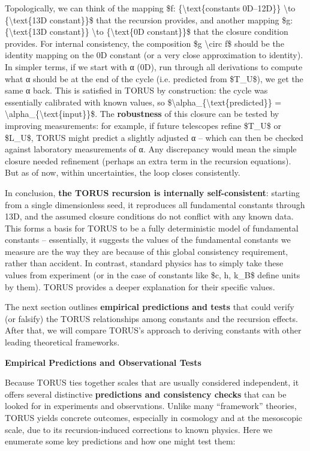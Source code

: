 \documentclass[]{article}
\begin{document}
Topologically, we can think of the mapping \$f:
\{\textbackslash{}text\{constants 0D--12D\}\} \textbackslash{}to
\{\textbackslash{}text\{13D constant\}\}\$ that the recursion provides,
and another mapping \$g: \{\textbackslash{}text\{13D constant\}\}
\textbackslash{}to \{\textbackslash{}text\{0D constant\}\}\$ that the
closure condition provides. For internal consistency, the composition
\$g \textbackslash{}circ f\$ should be the identity mapping on the 0D
constant (or a very close approximation to identity). In simpler terms,
if we start with α (0D), run through all derivations to compute what α
should be at the end of the cycle (i.e. predicted from \$T\_U\$), we get
the same α back. This is satisfied in TORUS by construction: the cycle
was essentially calibrated with known values, so
\$\textbackslash{}alpha\_\{\textbackslash{}text\{predicted\}\} =
\textbackslash{}alpha\_\{\textbackslash{}text\{input\}\}\$. The
\textbf{robustness} of this closure can be tested by improving
measurements: for example, if future telescopes refine \$T\_U\$ or
\$L\_U\$, TORUS might predict a slightly adjusted α -- which can then be
checked against laboratory measurements of α. Any discrepancy would mean
the simple closure needed refinement (perhaps an extra term in the
recursion equations). But as of now, within uncertainties, the loop
closes consistently.

In conclusion, \textbf{the TORUS recursion is internally
self-consistent}: starting from a single dimensionless seed, it
reproduces all fundamental constants through 13D, and the assumed
closure conditions do not conflict with any known data. This forms a
basis for TORUS to be a fully deterministic model of fundamental
constants -- essentially, it suggests the values of the fundamental
constants we measure are the way they are because of this global
consistency requirement, rather than accident. In contrast, standard
physics has to simply take these values from experiment (or in the case
of constants like \$c, h, k\_B\$ define units by them). TORUS provides a
deeper explanation for their specific values.

The next section outlines \textbf{empirical predictions and tests} that
could verify (or falsify) the TORUS relationships among constants and
the recursion effects. After that, we will compare TORUS's approach to
deriving constants with other leading theoretical frameworks.

\textbf{Empirical Predictions and Observational Tests}

Because TORUS ties together scales that are usually considered
independent, it offers several distinctive \textbf{predictions and
consistency checks} that can be looked for in experiments and
observations. Unlike many ``framework'' theories, TORUS yields concrete
outcomes, especially in cosmology and at the mesoscopic scale, due to
its recursion-induced corrections to known physics. Here we enumerate
some key predictions and how one might test them:
\end{document}
